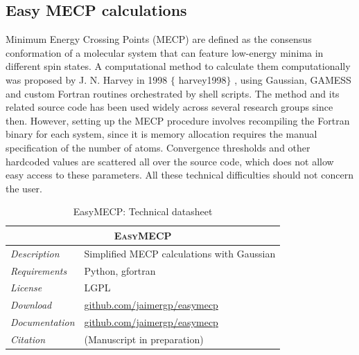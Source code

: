 \subsection{Easy MECP calculations}

Minimum Energy Crossing Points (MECP) are defined as the consensus conformation of a molecular system that can feature low-energy minima in different spin states. A computational method to calculate them computationally was proposed by J. N. Harvey in 1998 $ \{ $ harvey1998$ \} $ , using Gaussian, GAMESS and custom Fortran routines orchestrated by shell scripts. The method and its related source code has been used widely across several research groups since then. However, setting up the MECP procedure involves recompiling the Fortran binary for each system, since it is memory allocation requires the manual specification of the number of atoms. Convergence thresholds and other hardcoded values are scattered all over the source code, which does not allow easy access to these parameters. All these technical difficulties should not concern the user.


\begin{table}[hbtp]
	\caption{EasyMECP: Technical datasheet}
	\footnotesize
	\newcommand{\tableheading}[1]{\multicolumn{2}{c}{\textsc{#1}}}
	\begin{tabularx}{\textwidth}{RL}
		\toprule
		\tableheading{EasyMECP}\\
		\toprule
		\textit{Description} & Simplified MECP calculations with Gaussian \\
		\midrule
		\textit{Requirements} & Python, gfortran \\
		\midrule
		\textit{License} & LGPL \\
		\midrule
		\textit{Download} & \href{https://github.com/jaimergp/easymecp}{github.com/jaimergp/easymecp} \\
		\midrule
		\textit{Documentation} & \href{https://github.com/jaimergp/easymecp}{github.com/jaimergp/easymecp} \\
		\midrule
		\textit{Citation} & (Manuscript in preparation) \\
		\bottomrule

	\end{tabularx}
\end{table}

